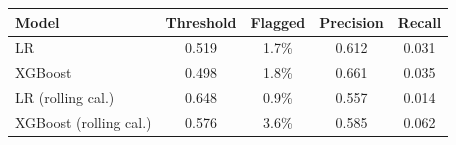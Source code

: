 \begin{tabular}{lcccc}
\toprule
Model & Threshold & Flagged & Precision & Recall \\
\midrule
LR & 0.519 & 1.7\% & 0.612 & 0.031 \\
XGBoost & 0.498 & 1.8\% & 0.661 & 0.035 \\
LR (rolling cal.) & 0.648 & 0.9\% & 0.557 & 0.014 \\
XGBoost (rolling cal.) & 0.576 & 3.6\% & 0.585 & 0.062 \\
\bottomrule
\end{tabular}
